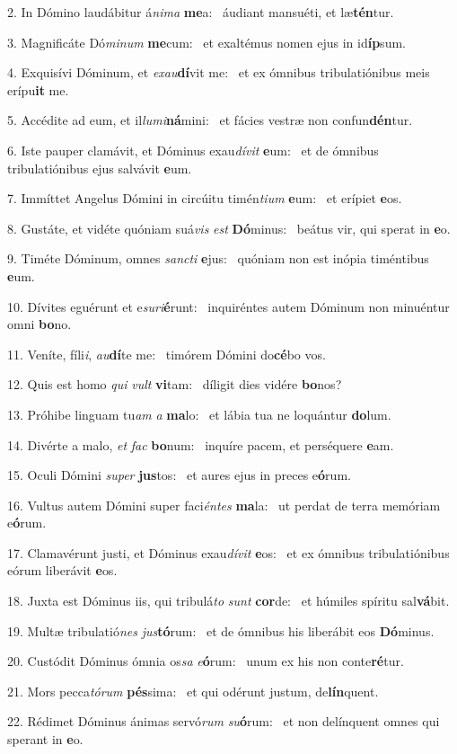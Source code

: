 2. In Dómino laudábitur á\textit{ni}\textit{ma} \textbf{me}a: \ast\  áudiant mansuéti, et læ\textbf{tén}tur.\

3. Magnificáte Dó\textit{mi}\textit{num} \textbf{me}cum: \ast\  et exaltémus nomen ejus in id\textbf{íp}sum.\

4. Exquisívi Dóminum, et \textit{ex}\textit{au}\textbf{dí}vit me: \ast\  et ex ómnibus tribulatiónibus meis erípu\textbf{it} me.\

5. Accédite ad eum, et il\textit{lu}\textit{mi}\textbf{ná}mini: \ast\  et fácies vestræ non confun\textbf{dén}tur.\

6. Iste pauper clamávit, et Dóminus exau\textit{dí}\textit{vit} \textbf{e}um: \ast\  et de ómnibus tribulatiónibus ejus salvávit \textbf{e}um.\

7. Immíttet Angelus Dómini in circúitu timén\textit{ti}\textit{um} \textbf{e}um: \ast\  et erípiet \textbf{e}os.\

8. Gustáte, et vidéte quóniam suá\textit{vis} \textit{est} \textbf{Dó}minus: \ast\  beátus vir, qui sperat in \textbf{e}o.\

9. Timéte Dóminum, omnes \textit{sanc}\textit{ti} \textbf{e}jus: \ast\  quóniam non est inópia timéntibus \textbf{e}um.\

10. Dívites eguérunt et e\textit{su}\textit{ri}\textbf{é}runt: \ast\  inquiréntes autem Dóminum non minuéntur omni \textbf{bo}no.\

11. Veníte, fíli\textit{i}, \textit{au}\textbf{dí}te me: \ast\  timórem Dómini do\textbf{cé}bo vos.\

12. Quis est homo \textit{qui} \textit{vult} \textbf{vi}tam: \ast\  díligit dies vidére \textbf{bo}nos?\

13. Próhibe linguam tu\textit{am} \textit{a} \textbf{ma}lo: \ast\  et lábia tua ne loquántur \textbf{do}lum.\

14. Divérte a malo, \textit{et} \textit{fac} \textbf{bo}num: \ast\  inquíre pacem, et perséquere \textbf{e}am.\

15. Oculi Dómini \textit{su}\textit{per} \textbf{jus}tos: \ast\  et aures ejus in preces e\textbf{ó}rum.\

16. Vultus autem Dómini super faci\textit{én}\textit{tes} \textbf{ma}la: \ast\  ut perdat de terra memóriam e\textbf{ó}rum.\

17. Clamavérunt justi, et Dóminus exau\textit{dí}\textit{vit} \textbf{e}os: \ast\  et ex ómnibus tribulatiónibus eórum liberávit \textbf{e}os.\

18. Juxta est Dóminus iis, qui tribulá\textit{to} \textit{sunt} \textbf{cor}de: \ast\  et húmiles spíritu sal\textbf{vá}bit.\

19. Multæ tribulatió\textit{nes} \textit{jus}\textbf{tó}rum: \ast\  et de ómnibus his liberábit eos \textbf{Dó}minus.\

20. Custódit Dóminus ómnia os\textit{sa} \textit{e}\textbf{ó}rum: \ast\  unum ex his non conte\textbf{ré}tur.\

21. Mors pecca\textit{tó}\textit{rum} \textbf{pés}sima: \ast\  et qui odérunt justum, de\textbf{lín}quent.\

22. Rédimet Dóminus ánimas servó\textit{rum} \textit{su}\textbf{ó}rum: \ast\  et non delínquent omnes qui sperant in \textbf{e}o.\

